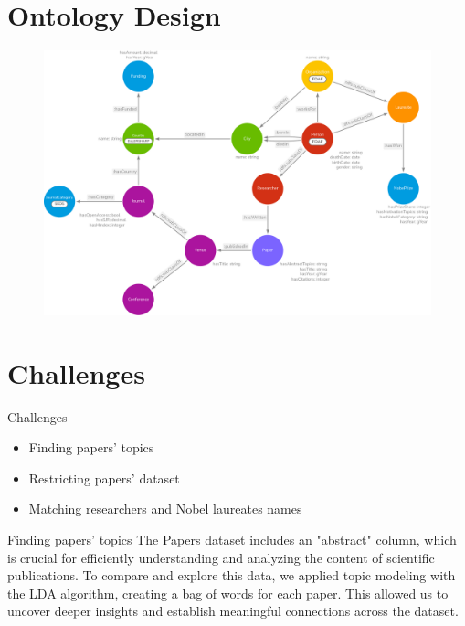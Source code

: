 \documentclass[aspectratio=169,xcolor=dvipsnames]{beamer}
\begin{document}
\section{Ontology Design}

\begin{frame}
	\begin{figure}
		\includegraphics[width=0.75\linewidth]{../nobelOntologyTransparent.png}
	\end{figure}
\end{frame}

\section{Challenges}

\begin{frame}{Challenges}
	\begin{itemize}
		\item Finding papers' topics
		      \vspace{1em}
		\item Restricting papers' dataset
		      \vspace{1em}
		\item Matching researchers and Nobel laureates names
	\end{itemize}
\end{frame}

\begin{frame}{Finding papers' topics}
	The Papers dataset includes an "abstract" column, which is crucial for efficiently understanding
	and analyzing the content of scientific publications. To compare and explore this data, we applied
	topic modeling with the LDA algorithm, creating a bag of words for each paper. This allowed us to
	uncover deeper insights and establish meaningful connections across the dataset.
\end{frame}
\end{document}
